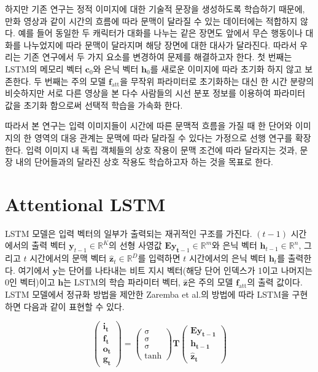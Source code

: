 \documentclass{kcc}
\newcommand{\vy}[0]{\mathbf{y}}
\newcommand{\vc}[0]{\mathbf{c}}
\newcommand{\vh}[0]{\mathbf{h}}
\newcommand{\vt}[0]{\mathbf{t}}
\newcommand{\vz}[0]{\mathbf{z}}
\newcommand{\mE}[0]{\mathbf{E}}
\begin{document}
하지만 기존 연구는 정적 이미지에 대한 기술적 문장을 생성하도록 학습하기 때문에, 만화 영상과 같이 시간의 흐름에 따라 문맥이 달라질 수 있는 데이터에는 적합하지 않다. 예를 들어 동일한 두 캐릭터가 대화를 나누는 같은 장면도 앞에서 무슨 행동이나 대화를 나누었지에 따라 문맥이 달라지며 해당 장면에 대한 대사가 달라진다. 따라서 우리는 기존 연구에서 두 가지 요소를 변경하여 문제를 해결하고자 한다. 첫 번째는 LSTM의 메모리 벡터 $\vc_0$와 은닉 벡터 $\vh_0$를 새로운 이미지에 따라 초기화 하지 않고 보존한다. 두 번째는 주의 모델 $\mathbf{f}_{\text{att}}$을 무작위 파라미터로 초기화하는 대신 한 시간 분량의 비슷하지만 서로 다른 영상을 본 다수 사람들의 시선 분포 정보를 이용하여 파라미터 값을 초기화 함으로써 선택적 학습을 가속화 한다.  

따라서 본 연구는 입력 이미지들이 시간에 따른 문맥적 흐름을 가질 때 한 단어와 이미지의 한 영역의 대응 관계는 문맥에 따라 달라질 수 있다는 가정으로 선행 연구를 확장한다. 입력 이미지 내 독립 객체들의 상호 작용이 문맥 조건에 따라 달라지는 것과, 문장 내의 단어들과의 달라진 상호 작용도 학습하고자 하는 것을 목표로 한다.

\section{Attentional LSTM}

LSTM 모델은 입력 벡터의 일부가 출력되는 재귀적인 구조를 가진다. $(t-1)$ 시간에서의 출력 벡터 $\vy_{t-1} \in \mathbb{R}^K$의 선형 사영값 $\mE\vy_{\vt-1} \in \mathbb{R}^m$와 은닉 벡터 $\vh_{t-1} \in \mathbb{R}^n$, 그리고 $t$ 시간에서의 문맥 벡터 $\hat{\vz}_t \in \mathbb{R}^D$를 입력하면 $t$ 시간에서의 은닉 벡터 $\vh_t$를 출력한다. 여기에서 $\vy$는 단어를 나타내는 비트 지시 벡터(해당 단어 인덱스가 1이고 나머지는 0인 벡터)이고 $\vh$는 LSTM의 학습 파라미터 벡터, $\hat{\vz}$은 주의 모델 $\mathbf{f}_{\text{att}}$의 출력 값이다. LSTM 모델에서 정규화 방법을 제안한 Zaremba et al.\cite{Zaremba2015}의 방법에 따라 LSTM을 구현하면 다음과 같이 표현할 수 있다.

\begin{equation}
\begin{pmatrix}\mathbf{i_{t}}\\\mathbf{f_{t}}\\\mathbf{o_{t}}\\\mathbf{g_{t}}\end{pmatrix} =
  \begin{pmatrix}\mathrm{\sigma}\\\mathrm{\sigma}\\\mathrm{\sigma}\\\tanh\end{pmatrix}
  \mathbf{T}
  \begin{pmatrix}\mathbf{Ey_{t-1}}\\\mathbf{h_{t-1}}\\\mathbf{\hat{z}_t}\end{pmatrix}
\end{equation}
\end{document}

